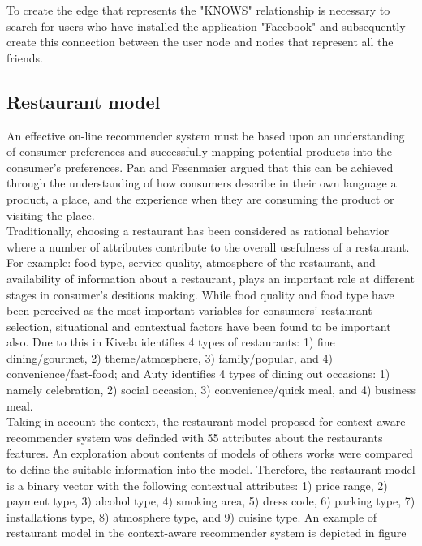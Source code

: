 To create the edge that represents the "KNOWS" relationship is necessary to
search for users who have installed the application "Facebook" and subsequently
create this connection between the user node and nodes that represent all the
friends.




\subsection{Restaurant model} 

An effective on-line recommender system must be based upon an
understanding of consumer  preferences and successfully mapping
potential products into the consumer’s
preferences\cite{adomavicius2011context}. Pan and
Fesenmaier\cite{pan2006online} argued that this can be achieved
through the understanding of how consumers describe in their own
language a product, a place, and the experience when they are
consuming the product or visiting the place.\\ Traditionally,
choosing a restaurant has been considered as rational behavior where a
number of attributes contribute to the overall usefulness of a
restaurant. For example: food type, service quality, atmosphere of the
restaurant, and availability of information about a restaurant, plays
an important role at different stages in consumer’s desitions
making\cite{auty1992consumer}. While food quality and food type have
been perceived as the most important variables for consumers’
restaurant selection, situational and contextual factors have been
found to be important also. Due to this in
Kivela\cite{jack1997restaurant} identifies 4 types of restaurants: 1)
fine dining/gourmet, 2) theme/atmosphere, 3) family/popular, and 4)
convenience/fast-food; and Auty\cite{auty1992consumer} identifies 4
types of dining out occasions: 1) namely celebration, 2) social
occasion, 3) convenience/quick meal, and 4) business meal.\\
Taking in account the context, the restaurant model proposed for
context-aware recommender system was definded with 55 attributes about the
restaurants features. An exploration about contents of models of
others works were compared to define the suitable information into the
model. Therefore, the restaurant model is a binary vector with the
following contextual attributes: 1) price range, 2) payment type, 3) alcohol
type, 4) smoking area, 5) dress code, 6) parking type, 7)
installations type, 8) atmosphere type, and 9) cuisine type. An
example of restaurant model in the context-aware recommender system is depicted in figure
